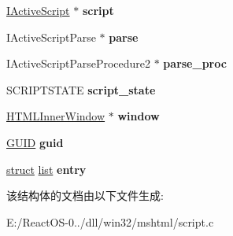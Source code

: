 \begin{DoxyCompactItemize}
\item 
\mbox{\label{struct_script_host_a5388ce145a30f78e726c44ec828a3fbf}} 
\hyperlink{interface_i_active_script}{I\+Active\+Script} $\ast$ {\bfseries script}
\item 
\mbox{\label{struct_script_host_a83f0651a654afc4b6307a66dd5e42280}} 
I\+Active\+Script\+Parse $\ast$ {\bfseries parse}
\item 
\mbox{\label{struct_script_host_a3471794c256a22cc8eac763a137389aa}} 
I\+Active\+Script\+Parse\+Procedure2 $\ast$ {\bfseries parse\+\_\+proc}
\item 
\mbox{\label{struct_script_host_a965963c1e475624d62c0172e8687f364}} 
S\+C\+R\+I\+P\+T\+S\+T\+A\+TE {\bfseries script\+\_\+state}
\item 
\mbox{\label{struct_script_host_a9c208265b090c5131c055cb50d62c888}} 
\hyperlink{struct_h_t_m_l_inner_window}{H\+T\+M\+L\+Inner\+Window} $\ast$ {\bfseries window}
\item 
\mbox{\label{struct_script_host_a43f7747c6078fea1b6fad7a77fba0eeb}} 
\hyperlink{interface_g_u_i_d}{G\+U\+ID} {\bfseries guid}
\item 
\mbox{\label{struct_script_host_a9c80ab2d36f89edc89f3ed10bb4b0f0d}} 
\hyperlink{interfacestruct}{struct} \hyperlink{classlist}{list} {\bfseries entry}
\end{DoxyCompactItemize}


该结构体的文档由以下文件生成\+:\begin{DoxyCompactItemize}
\item 
E\+:/\+React\+O\+S-\/0../dll/win32/mshtml/script.\+c\end{DoxyCompactItemize}

